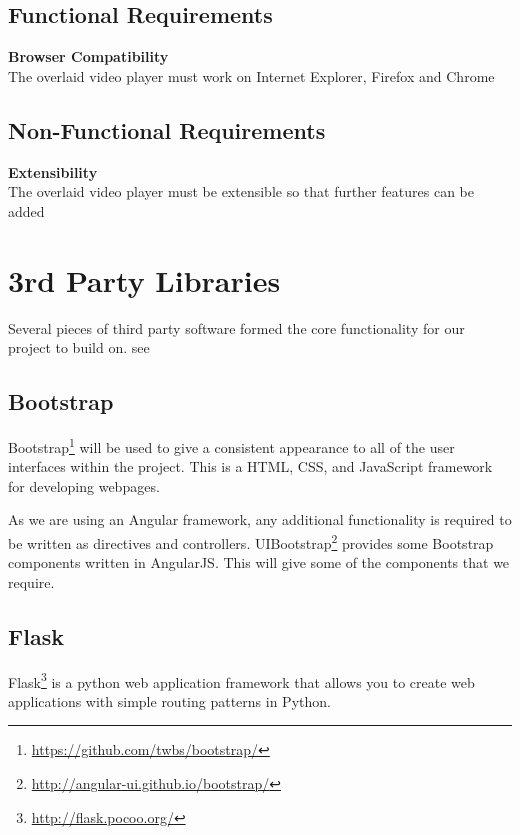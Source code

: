 \subsection{Functional Requirements}
\begin{requirement}[%
 label=\textbf{F\arabic*}]
\item \textbf{Browser Compatibility}  \hfill \\ The overlaid video player must work on Internet Explorer, Firefox and Chrome \label{Req:Browser Compatibility}
\end{requirement}

\subsection{Non-Functional Requirements}
\begin{requirement}[%
 label=\textbf{N\arabic*}]
\item \textbf{Extensibility}  \hfill \\ The overlaid video player must be extensible so that further features can be added \label{Req:Extensibility} %
\end{requirement}
 

\section{3rd Party Libraries}
Several pieces of third party software formed the core functionality for our project to build on. see

\subsection{Bootstrap}
\label{Section:Bootstrap}
Bootstrap\footnote{\url{https://github.com/twbs/bootstrap/}} will be used to give a consistent appearance to all of the user interfaces within the project. This is a HTML, \gls{CSS}, and JavaScript framework for developing webpages.

As we are using an Angular framework, any additional functionality is required to be written as directives and controllers. UIBootstrap\footnote{\url{http://angular-ui.github.io/bootstrap/}} provides some Bootstrap components written in \gls{AngularJS}. This will give some of the components that we require.

\subsection{Flask}
\label{Section:Flask}
Flask\footnote{\url{http://flask.pocoo.org/}} is a python web application framework that allows you to create web applications with simple routing patterns in Python.


